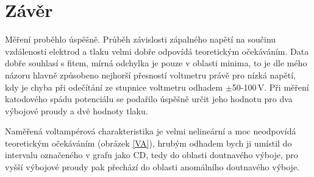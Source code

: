 \documentclass[12pt]{article}
\begin{document}
\section{Závěr}
Měření proběhlo úspěšně. Průběh závislosti zápalného napětí na součinu vzdáleností elektrod a tlaku velmi dobře odpovídá teoretickým očekáváním. Data dobře souhlasí s fitem, mírná odchylka je pouze v oblasti minima, to je dle mého názoru hlavně způsobeno nejhorší přesností voltmetru právě pro nízká napětí, kdy je chyba při odečítání ze stupnice voltmetru odhadem $\pm$50-100\,V. Při měření katodového spádu potenciálu se podařilo úspěšně určit jeho hodnotu pro dva výbojové proudy a dvě hodnoty tlaku.

Naměřená voltampérová charakteristika je velmi nelineární a moc neodpovídá teoretickým očekáváním (obrázek \ref{VA}), hrubým odhadem bych ji umístil do intervalu označeného v grafu jako CD, tedy do oblasti doutnavého výboje, pro vyšší výbojové proudy pak přechází do oblasti anomálního doutnavého výboje.
\end{document}
